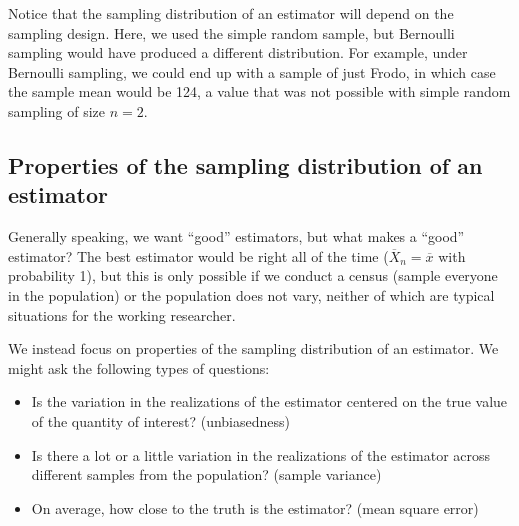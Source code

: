 \documentclass[
  letterpaper,
  DIV=11,
  numbers=noendperiod]{scrreprt}
\providecommand{\tightlist}{%
  \setlength{\itemsep}{0pt}\setlength{\parskip}{0pt}}\usepackage{longtable,booktabs,array}
\newcommand{\Xbar}{\overline{X}}
\theoremstyle{definition}
\theoremstyle{definition}
\theoremstyle{plain}
\theoremstyle{remark}
\begin{document}
\begin{tcolorbox}[enhanced jigsaw, colframe=quarto-callout-note-color-frame, rightrule=.15mm, colback=white, breakable, opacityback=0, coltitle=black, opacitybacktitle=0.6, arc=.35mm, left=2mm, leftrule=.75mm, toptitle=1mm, colbacktitle=quarto-callout-note-color!10!white, titlerule=0mm, title=\textcolor{quarto-callout-note-color}{\faInfo}\hspace{0.5em}{Note}, bottomrule=.15mm, bottomtitle=1mm, toprule=.15mm]

Notice that the sampling distribution of an estimator will depend on the
sampling design. Here, we used the simple random sample, but Bernoulli
sampling would have produced a different distribution. For example,
under Bernoulli sampling, we could end up with a sample of just Frodo,
in which case the sample mean would be 124, a value that was not
possible with simple random sampling of size \(n=2\).

\end{tcolorbox}

\hypertarget{properties-of-the-sampling-distribution-of-an-estimator}{%
\subsection{Properties of the sampling distribution of an
estimator}\label{properties-of-the-sampling-distribution-of-an-estimator}}

Generally speaking, we want ``good'' estimators, but what makes a
``good'' estimator? The best estimator would be right all of the time
(\(\Xbar_n = \overline{x}\) with probability 1), but this is only
possible if we conduct a census (sample everyone in the population) or
the population does not vary, neither of which are typical situations
for the working researcher.

We instead focus on properties of the sampling distribution of an
estimator. We might ask the following types of questions:

\begin{itemize}
\tightlist
\item
  Is the variation in the realizations of the estimator centered on the
  true value of the quantity of interest? (unbiasedness)
\item
  Is there a lot or a little variation in the realizations of the
  estimator across different samples from the population? (sample
  variance)
\item
  On average, how close to the truth is the estimator? (mean square
  error)
\end{itemize}
\end{document}
